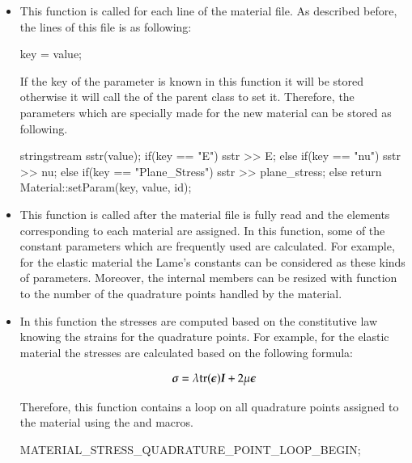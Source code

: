 \begin{itemize}

\item {}  This function  is called for each  line of the material  file. As described before, the lines of
  this file is as following:
  \begin {cpp}
    key = value;
  \end{cpp}
  If the key of the parameter is known in
  this  function  it  will  be   stored  otherwise  it  will  call  the
   of the parent class to set it.
  Therefore, the parameters which are specially made for the new material
  can be stored as following.

  \begin{cpp}
    stringstream sstr(value);
    if(key == "E") { sstr >> E; }
    else if(key == "nu") { sstr >> nu; }
    else if(key == "Plane_Stress") { sstr >> plane_stress; }
    else { return Material::setParam(key, value, id); }
  \end{cpp}

\item {} This function is called after the material file is fully read and the
  elements  corresponding  to  each  material are  assigned.  In  this
  function, some of the constant parameters which
  are frequently used are calculated. For example, for the
  elastic material the Lame's constants  can be considered as these kinds
  of parameters.  Moreover, the  internal members can  be resized  with
   function to the number of the quadrature
  points handled by the material.

\item {}  In this function the stresses are computed based on the constitutive
  law knowing the  strains for the quadrature points.  For example, for
  the  elastic  material the  stresses  are  calculated  based on  the
  following formula:

 \begin{equation}\label{eqn:smm:constitutive_elastic}
    \boldsymbol{\sigma } =\lambda\mathrm{tr}(\boldsymbol{\epsilon})\boldsymbol{I}+2 \mu \boldsymbol{\epsilon}
  \end{equation}

Therefore, this
  function contains  a loop on  all quadrature points assigned  to the
  material using the
   and
    macros.

  \begin{cpp}
    MATERIAL_STRESS_QUADRATURE_POINT_LOOP_BEGIN;


\end{cpp}
\end{itemize}

